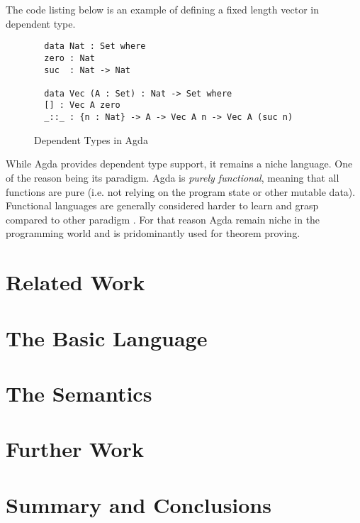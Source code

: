 \documentclass[a4paper,12pt]{report}
\begin{document}
\par
The code listing below is an example of defining a fixed length vector in 
dependent type. 

\begin{figure}[H]
  \begin{lstlisting}  
  data Nat : Set where
  zero : Nat
  suc  : Nat -> Nat  
  
  data Vec (A : Set) : Nat -> Set where
  [] : Vec A zero
  _::_ : {n : Nat} -> A -> Vec A n -> Vec A (suc n)
  \end{lstlisting}
  \caption{Dependent Types in Agda}
\end{figure}

\par
While Agda provides dependent type support, it remains a niche language. One of 
the reason being its paradigm. Agda is \textit{purely functional}, meaning that 
all functions are pure (i.e. not relying on the program state or other mutable 
data). Functional languages are generally considered harder to learn and grasp 
compared to other paradigm \cite{fpHarder}. For that reason Agda remain niche in 
the programming world and is pridominantly used for theorem proving.





\chapter{Related Work}

\chapter{The Basic Language}

\chapter{The Semantics}

\chapter{Further Work}

\chapter{Summary and Conclusions} 


\appendix
\singlespacing

\printbibliography
\end{document}
